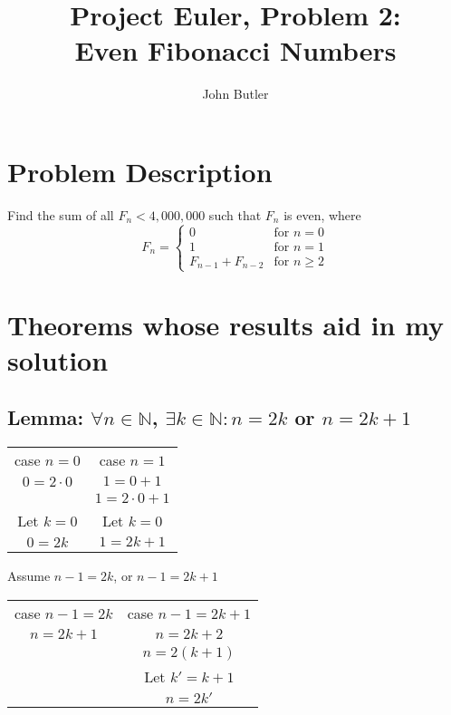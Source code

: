 \documentclass[11pt, oneside]{article}   	%
\title{Project Euler, Problem 2:\\\large{Even Fibonacci Numbers}}
\author{John Butler}
\date{}							%
\begin{document}
\maketitle

\section{Problem Description}
	Find the sum of all $F_n < 4,000,000$ such that $F_n$ is even, where
	\[ F_n  = \begin{cases}
		0 & \text{for } n = 0 \\
		1 & \text{for } n = 1 \\
		F_{n-1} + F_{n-2} & \text{for } n \ge 2
	\end{cases}	\]

\section{Theorems whose results aid in my solution}
	\subsection{Lemma: $\forall n \in \mathbb{N}$, $\exists k \in \mathbb{N}: n = 2k$ or $n =2k + 1$}
		\begin{center}
		\begin{tabular}{c|c}
			case $n = 0$&case $n = 1$\\
			$0 = 2\cdot 0$&$1 = 0 + 1$\\
			&$1 = 2\cdot 0 + 1$\\
			Let $k  =0$& Let $k = 0$\\
			$0 = 2k$&$1 = 2k + 1$
		\end{tabular}
		\end{center}
			Assume $n - 1 = 2k$, or $n - 1 = 2k + 1$\\
		\begin{center}
		\begin{tabular}{c|c}
			case $n - 1 = 2k$&case $n - 1 = 2k + 1$\\
			$n = 2k + 1$&$n = 2k + 2$\\
			&$n = 2(k + 1)$\\
			&Let $k' = k + 1$\\
			&$n = 2k'$
		\end{tabular}
		\end{center}

\end{document}
